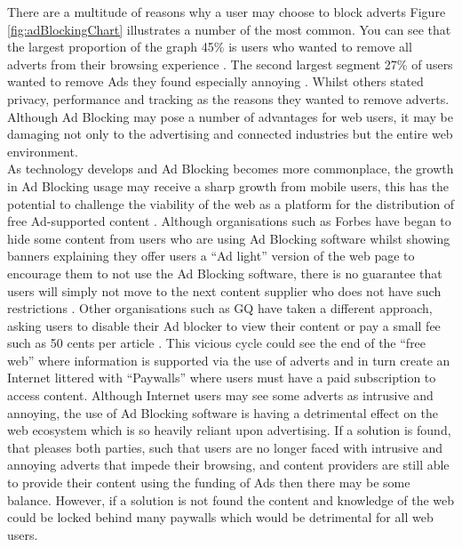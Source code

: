 \documentclass[12pt]{article}
\begin{document}
There are a multitude of reasons why a user may choose to block adverts Figure \ref{fig:adBlockingChart} illustrates a number of the most common. You can see that the largest proportion of the graph 45\% is users who wanted to remove all adverts from their browsing experience \parencite{publishersWeb}. The second largest segment 27\% of users wanted to remove Ads they found especially annoying \parencite{publishersWeb}. Whilst others stated privacy, performance and tracking as the reasons they wanted to remove adverts. Although Ad Blocking may pose a number of advantages for web users, it may be damaging not only to the advertising and connected industries but the entire web environment. \\

As technology develops and Ad Blocking becomes more commonplace, the growth in Ad Blocking usage may receive a sharp growth from mobile users,  this has the potential to challenge the viability of the web as a platform for the distribution of free Ad-supported content \parencite{adobeAdBlock}. Although organisations such as Forbes have began to hide some content from users who are using Ad Blocking software whilst showing banners explaining they offer users a ``Ad light'' version of the web page to encourage them to not use the Ad Blocking software, there is no guarantee that users will simply not move to the next content supplier who does not have such restrictions \parencite{publishersWeb}. Other organisations such as GQ have taken a different approach, asking users to disable their Ad blocker to view their content or pay a small fee such as 50 cents per article \parencite{gq}.  This vicious cycle could see the end of the ``free web'' where information is supported via the use of adverts and in turn create an Internet littered with ``Paywalls'' where users must have a paid subscription to access content. Although Internet users may see some adverts as intrusive and annoying, the use of Ad Blocking software is having a detrimental effect on the web ecosystem which is so heavily reliant upon advertising. If a solution is found, that pleases both parties, such that users are no longer faced with intrusive and annoying adverts that impede their browsing, and content providers are still able to provide their content using the funding of Ads then there may be some balance. However, if a solution is not found the content and knowledge of the web could be locked behind many paywalls which would be detrimental for all web users.
\end{document}
